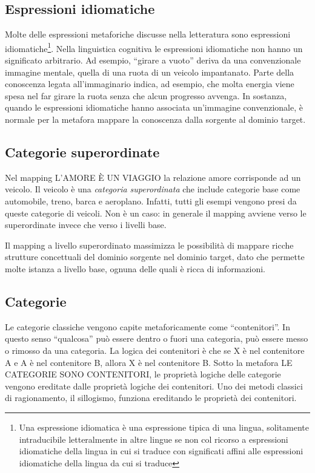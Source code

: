 \subsection{Espressioni idiomatiche}
Molte delle espressioni metaforiche discusse nella letteratura sono espressioni idiomatiche\footnote{Una espressione idiomatica è una espressione tipica di una lingua, solitamente intraducibile letteralmente in altre lingue se non col ricorso a espressioni idiomatiche della lingua in cui si traduce con significati affini alle espressioni idiomatiche della lingua da cui si traduce}. Nella linguistica cognitiva le espressioni idiomatiche non hanno un significato arbitrario. Ad esempio, ``girare a vuoto'' deriva da una convenzionale immagine mentale, quella di una ruota di un veicolo impantanato. Parte della conoscenza legata all’immaginario indica, ad esempio, che molta energia viene spesa nel far girare la ruota senza che alcun progresso avvenga. In sostanza, quando le espressioni idiomatiche hanno associata un’immagine convenzionale, è normale per la metafora mappare la conoscenza dalla sorgente al dominio target.

\subsection{Categorie superordinate}
Nel mapping L’AMORE È UN VIAGGIO la relazione amore corrisponde ad un veicolo. Il veicolo è una \emph{categoria superordinata} che include categorie base come automobile, treno, barca e aeroplano. Infatti, tutti gli esempi vengono presi da queste categorie di veicoli. Non è un caso: in generale il mapping avviene verso le superordinate invece che verso i livelli base.

Il mapping a livello superordinato massimizza le possibilità di mappare ricche strutture concettuali del dominio sorgente nel dominio target, dato che permette molte istanza a livello base, ognuna delle quali è ricca di informazioni.

\subsection{Categorie}
Le categorie classiche vengono capite metaforicamente come ``contenitori''. In questo senso ``qualcosa'' può essere dentro o fuori una categoria, può essere messo o rimosso da una categoria. La logica dei contenitori è che se X è nel contenitore A e A è nel contenitore B, allora X è nel contenitore B. Sotto la metafora LE CATEGORIE SONO CONTENITORI, le proprietà logiche delle categorie vengono ereditate dalle proprietà logiche dei contenitori. Uno dei metodi classici di ragionamento, il sillogismo, funziona ereditando le proprietà dei contenitori.

